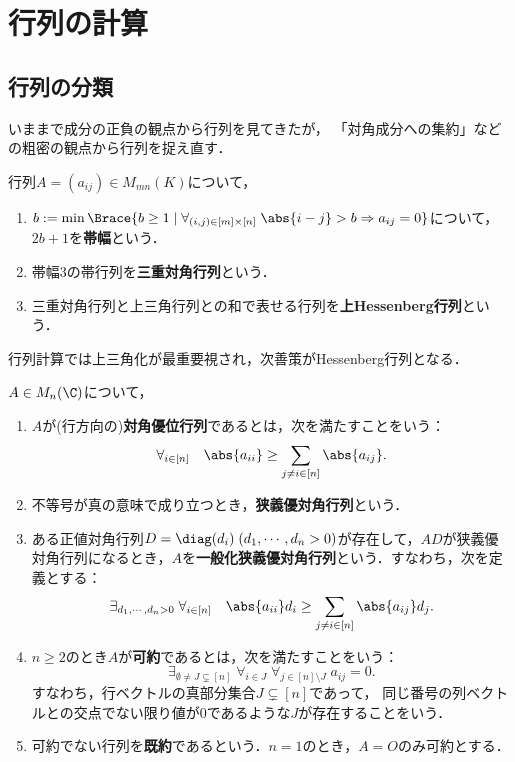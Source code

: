 \documentclass[uplatex, dvipdfmx]{jsreport}
\begin{document}
\section{行列の計算}

\subsection{行列の分類}

\begin{tcolorbox}[colframe=ForestGreen, colback=ForestGreen!10!white,breakable,colbacktitle=ForestGreen!40!white,coltitle=black,fonttitle=\bfseries\sffamily,
title=]
    いままで成分の正負の観点から行列を見てきたが，
    「対角成分への集約」などの粗密の観点から行列を捉え直す．
\end{tcolorbox}

\begin{definition}
    行列$A=(a_{ij})\in M_{mn}(K)$について，
    \begin{enumerate}
        \item $b:=\min\Brace{b\ge1\mid\forall_{(i,j)\in[m]\times[n]}\;\abs{i-j}>b\Rightarrow a_{ij}=0}$について，$2b+1$を\textbf{帯幅}という．
        \item 帯幅3の帯行列を\textbf{三重対角行列}という．
        \item 三重対角行列と上三角行列との和で表せる行列を\textbf{上Hessenberg行列}という．
    \end{enumerate}
\end{definition}
\begin{remarks}
    行列計算では上三角化が最重要視され，次善策がHessenberg行列となる．
\end{remarks}

\begin{definition}
    $A\in M_n(\C)$について，
    \begin{enumerate}
        \item $A$が(行方向の)\textbf{対角優位行列}であるとは，次を満たすことをいう：
        \[\forall_{i\in[n]}\quad\abs{a_{ii}}\ge\sum_{j\ne i\in[n]}\abs{a_{ij}}.\]
        \item 不等号が真の意味で成り立つとき，\textbf{狭義優対角行列}という．
        \item ある正値対角行列$D=\diag(d_i)\;(d_1,\cdots,d_n>0)$が存在して，$AD$が狭義優対角行列になるとき，$A$を\textbf{一般化狭義優対角行列}という．すなわち，次を定義とする：
        \[\exists_{d_1,\cdots,d_n>0}\;\forall_{i\in[n]}\quad\abs{a_{ii}}d_i\ge\sum_{j\ne i\in[n]}\abs{a_{ij}}d_j.\]
        \item $n\ge2$のとき$A$が\textbf{可約}であるとは，次を満たすことをいう：
        \[\exists_{\emptyset\ne J\subsetneq[n]}\;\forall_{i\in J}\;\forall_{j\in[n]\setminus J}\;a_{ij}=0.\]
        すなわち，行ベクトルの真部分集合$J\subsetneq [n]$であって，
        同じ番号の列ベクトルとの交点でない限り値が$0$であるような$J$が存在することをいう．
        \item 可約でない行列を\textbf{既約}であるという．$n=1$のとき，$A=O$のみ可約とする．
    \end{enumerate}
\end{definition}
\end{document}
